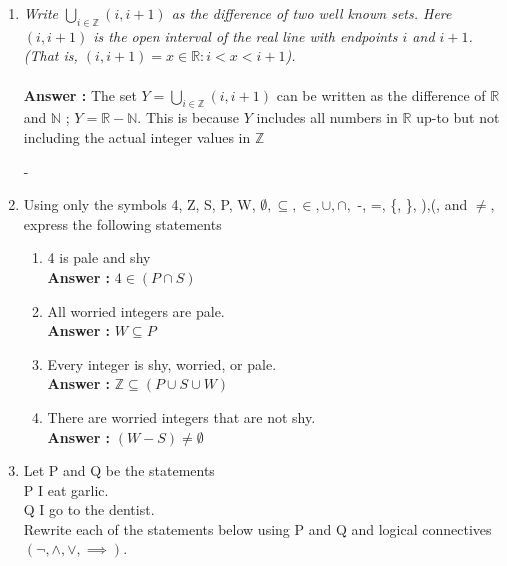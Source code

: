 \documentclass[a4paper,11pt]{article}
\begin{document}
\begin{enumerate}

\item \emph{Write $ \bigcup_{i\in \mathbb{Z}} (i, i+1)$ as the difference of two well known sets. Here $(i, i+1)$ is the open interval of the real line with endpoints $i$ and $i + 1$. (That is, $(i, i + 1) = {x \in \mathbb{R} : i < x < i + 1}$).} \\ \\
\textbf{Answer :} The set $Y = \bigcup_{i\in \mathbb{Z}} (i, i+1)$ can be written as the difference of $\mathbb{R}$ and $\mathbb{N}$ ; $Y = \mathbb{R}-\mathbb{N} $. This is because $Y$ includes all numbers in $\mathbb{R}$ up-to but not including the actual integer values in $\mathbb{Z}$


-%

\item Using only the symbols 4, Z, S, P, W, $\emptyset, \subseteq, \in, \cup, \cap,$ -, =, \{, \}, ),(, and $\neq$, express the following
statements
  
  \begin{enumerate}
  	\item 4 is pale and shy \\
  	\textbf{Answer :} $4 \in (P \cap S)$
  	\item All worried integers are pale. \\
  	\textbf{Answer :} $W \subseteq P$
  	\item Every integer is shy, worried, or pale. \\
  	\textbf{Answer :} $\mathbb{Z} \subseteq (P \cup S \cup W)$
  	\item There are worried integers that are not shy. \\
  	\textbf{Answer :} $(W - S) \neq \emptyset$
  \end{enumerate}



\item Let P and Q be the statements \\ P I eat garlic. \\ Q I go to the dentist. \\
Rewrite each of the statements below using P and Q and logical connectives $(\neg, \wedge, \vee, \implies)$.


\end{enumerate}
\end{document}
